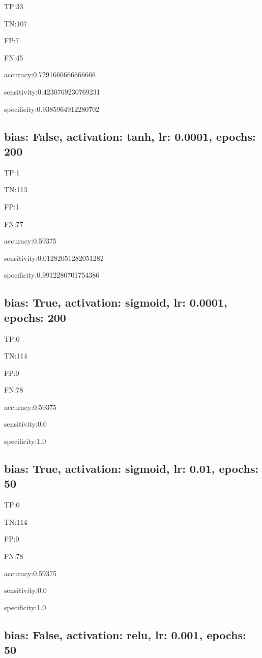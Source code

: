 \documentclass{article}
\begin{document}
TP:33

TN:107

FP:7

FN:45

accuracy:0.7291666666666666

sensitivity:0.4230769230769231

specificity:0.9385964912280702



\subsection{bias: False, activation: tanh, lr: 0.0001, epochs: 200}

TP:1

TN:113

FP:1

FN:77

accuracy:0.59375

sensitivity:0.01282051282051282

specificity:0.9912280701754386



\subsection{bias: True, activation: sigmoid, lr: 0.0001, epochs: 200}

TP:0

TN:114

FP:0

FN:78

accuracy:0.59375

sensitivity:0.0

specificity:1.0



\subsection{bias: True, activation: sigmoid, lr: 0.01, epochs: 50}

TP:0

TN:114

FP:0

FN:78

accuracy:0.59375

sensitivity:0.0

specificity:1.0



\subsection{bias: False, activation: relu, lr: 0.001, epochs: 50}
\end{document}
